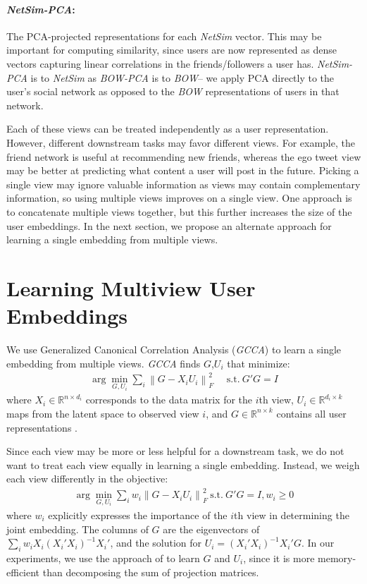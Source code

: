 \documentclass{article}
\newcommand{\gcca}{\emph{GCCA}} %
\newcommand{\bow}{\emph{BOW}} %
\newcommand{\bowpca}{\emph{BOW-PCA}} %
\newcommand{\bowpcawnet}{\emph{NetSim-PCA}} %
\newcommand{\collab}{\emph{NetSim}} %
\newcommand{\myparagraph}[1]{\vspace{-.2cm}\paragraph{#1}}
\begin{document}
\myparagraph{\bowpcawnet{}:} The PCA-projected representations for each \collab{} vector.    This may be important for computing similarity, since users are now represented as dense vectors capturing linear correlations in the friends/followers a user has.  \bowpcawnet{} is to \collab{} as \bowpca{} is to \bow -- we apply PCA directly to the user's social network as opposed to the \bow{} representations of users in that network.


Each of these views can be treated independently as a user representation.  However, different downstream tasks may favor different 
views. For example, the friend network is useful at recommending new friends, whereas the ego tweet view may be better at predicting what content a user will post in the future.
Picking a single view may ignore valuable information as views may contain complementary information,
so using multiple views improves on a single view. One approach is to concatenate multiple views together, but this further 
increases the size of the user embeddings. In the next section, we propose an alternate approach for learning
a single embedding from multiple views.


% 
\section{Learning Multiview User Embeddings}
\label{sec:method}
We use Generalized Canonical Correlation Analysis (\gcca{}) \cite{carroll1968generalization} to learn a single embedding
from multiple views. 
\gcca{} finds $G$,$U_i$ that minimize:
\begin{eqnarray}
\arg \min_{G,U_i} \sum_{i} \left\|G - X_i U_i \right\|_F^2 ~~~~~~
\mathrm{s.t.} \ G' G = I
\end{eqnarray}
where $X_i \in \mathbb{R}^{n \times d_i}$ corresponds to the data matrix for
the $i$th view, $U_i \in \mathbb{R}^{d_i \times k}$ maps from the latent space to observed view $i$, and $G \in \mathbb{R}^{n \times k}$  contains all user representations
\cite{van2006}.

Since each view may be more or less helpful for a downstream task, we do not want to treat each view equally in learning
a single embedding. Instead, we weigh each view differently in the objective:
\begin{eqnarray}
\arg \min_{G,U_i}\! \sum_{i}\! w_i\! \left\|G - X_i U_i \right\|_F^2 ~
\mathrm{s.t.} \ G' G = I, w_i \ge 0 \!\!
\end{eqnarray}
where $w_i$ explicitly expresses the importance of the $i$th view in determining the joint embedding.  The columns of $G$ are the eigenvectors of
$\sum_{i} w_i X_i (X_i' X_i)^{-1} X_i'$, and the solution for $U_i = (X_i' X_i)^{-1} X_i' G$.  In our experiments,
we use the approach of  to learn $G$ and $U_i$, since it is more memory-efficient than decomposing the sum of projection matrices.
\end{document}

